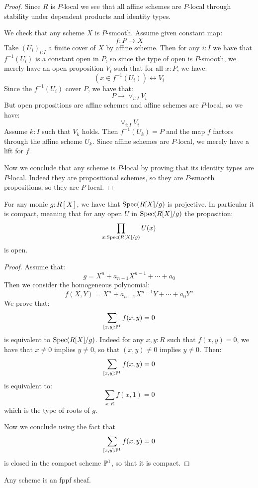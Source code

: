 \begin{proof}
Since $R$ is $P$-local we see that all affine schemes are $P$-local through stability under dependent products and identity types.

We check that any scheme $X$ is $P$-smooth. Assume given constant map:
\[f:P\to X\]
Take $(U_i)_{i:I}$ a finite cover of $X$ by affine scheme. Then for any $i:I$ we have that $f^{-1}(U_i)$ is a constant open in $P$, so since the type of open is $P$-smooth, we merely have an open proposition $V_i$ such that for all $x:P$, we have:
\[(x\in f^{-1}(U_i) )\leftrightarrow V_i\]
Since the $f^{-1}(U_i)$ cover $P$, we have that:
\[P\to \lor_{i:I} V_i\]
But open propositions are affine schemes and affine schemes are $P$-local, so we have:
\[ \lor_{i:I} V_i\]
Assume $k:I$ such that $V_k$ holds. Then $f^{-1}(U_k) = P$ and the map $f$ factors through the affine scheme $U_k$. Since affine schemes are $P$-local, we merely have a lift for $f$.

Now we conclude that any scheme is $P$-local by proving that its identity types are $P$-local. Indeed they are propositional schemes, so they are $P$-smooth propositions, so they are $P$-local.
\end{proof}

\begin{lemma}\label{roots-monic-proper}
For any monic $g:R[X]$, we have that $\operatorname{Spec}(R[X]/g)$ is projective. In particular it is compact, meaning that for any open $U$ in $\operatorname{Spec}(R[X]/g)$ the proposition:
\[\prod_{x:\operatorname{Spec}(R[X]/g)}U(x)\]
is open.
\end{lemma}

\begin{proof}
Assume that:
\[g=X^n+a_{n-1}X^{n-1}+\cdots+a_0\]
Then we consider the homogeneous polynomial:
\[f(X,Y) = X^n + a_{n-1}X^{n-1}Y+\cdots+a_0Y^n\]
We prove that:
\[\sum_{[x,y]:\mathbb{P}^1}f(x,y) = 0\]
is equivalent to $\operatorname{Spec}(R[X]/g)$. Indeed for any $x,y:R$ such that $f(x,y)=0$, we have that $x\not=0$ implies $y\not=0$, so that $(x,y)\not=0$ implies $y\not=0$. Then:
\[\sum_{[x,y]:\mathbb{P}^1}f(x,y) = 0\]
is equivalent to:
\[\sum_{x:R} f(x,1)=0\]
which is the type of roots of $g$. 

Now we conclude using the fact that 
\[\sum_{[x,y]:\mathbb{P}^1}f(x,y) = 0\]
is closed in the compact scheme $\mathbb{P}^1$, so that it is compact.
\end{proof}

\begin{proposition}\label{schemes-are-fppf-sheaves}
Any scheme is an fppf sheaf.
\end{proposition}

